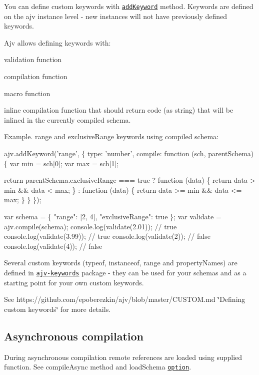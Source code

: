 You can define custom keywords with \href{#api-addkeyword}{\tt add\+Keyword} method. Keywords are defined on the {\ttfamily ajv} instance level -\/ new instances will not have previously defined keywords.

Ajv allows defining keywords with\+:
\begin{DoxyItemize}
\item validation function
\item compilation function
\item macro function
\item inline compilation function that should return code (as string) that will be inlined in the currently compiled schema.
\end{DoxyItemize}

Example. {\ttfamily range} and {\ttfamily exclusive\+Range} keywords using compiled schema\+:


\begin{DoxyCode}
ajv.addKeyword('range', \{ type: 'number', compile: function (sch, parentSchema) \{
  var min = sch[0];
  var max = sch[1];

  return parentSchema.exclusiveRange === true
          ? function (data) \{ return data > min && data < max; \}
          : function (data) \{ return data >= min && data <= max; \}
\} \});

var schema = \{ "range": [2, 4], "exclusiveRange": true \};
var validate = ajv.compile(schema);
console.log(validate(2.01)); // true
console.log(validate(3.99)); // true
console.log(validate(2)); // false
console.log(validate(4)); // false
\end{DoxyCode}


Several custom keywords (typeof, instanceof, range and property\+Names) are defined in \href{https://github.com/epoberezkin/ajv-keywords}{\tt ajv-\/keywords} package -\/ they can be used for your schemas and as a starting point for your own custom keywords.

See https\+://github.com/epoberezkin/ajv/blob/master/\+C\+U\+S\+T\+O\+M.\+md \char`\"{}\+Defining custom keywords\char`\"{} for more details.

\subsection*{Asynchronous compilation}

During asynchronous compilation remote references are loaded using supplied function. See {\ttfamily compile\+Async} method and {\ttfamily load\+Schema} \href{#options}{\tt option}.

